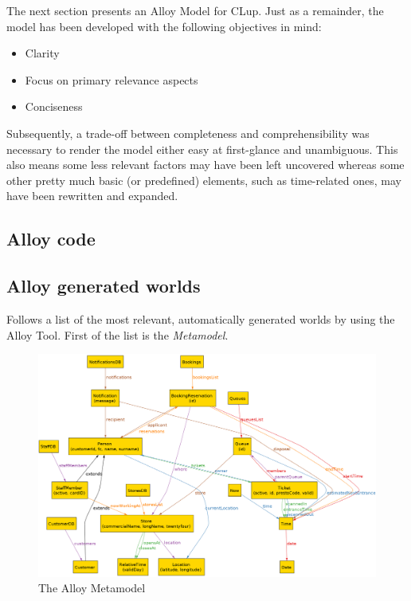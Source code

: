 The next section presents an Alloy Model for CLup. Just as a remainder, the model has been developed with the following objectives in mind: \newline

\begin{itemize}
    \item Clarity
    \item Focus on primary relevance aspects
    \item Conciseness
\end{itemize}

Subsequently, a trade-off between completeness and comprehensibility was necessary to render the model either easy at first-glance and unambiguous. \newline 
This also means some less relevant factors may have been left uncovered whereas some other pretty much basic (or predefined) elements, such as time-related ones, may have been rewritten and expanded. \newline 


{\color{gray}
}



\subsection{Alloy code \label{alloy_code}}




\subsection{Alloy generated worlds}
Follows a list of the most relevant, automatically generated worlds by using the Alloy Tool. First of the list is the \textit{Metamodel}.

\begin{figure} [H]
	\includegraphics[width=\linewidth]{../Alloy/metamodel.png}
	\caption{The Alloy Metamodel}
	\label{fig:AlloyMainModel}
\end{figure}


